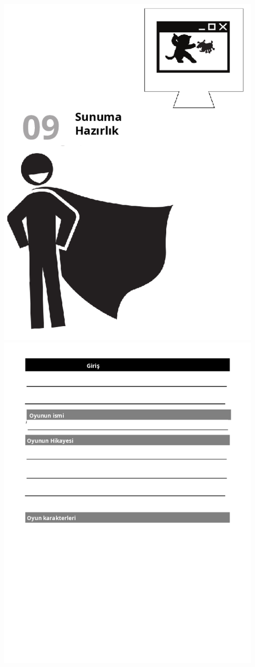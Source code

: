\documentclass[12pt, a4paper]{article}
\begin{document}
\newpage
\includegraphics[width=1\linewidth]{cebir-bolum-09-000.png}
\newpage
\includegraphics[width=1\linewidth]{cebirsplit-44.png}
\end{document}
